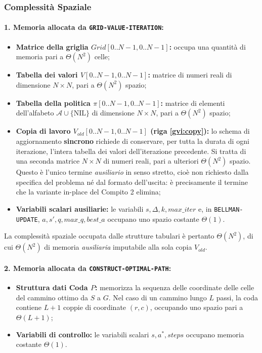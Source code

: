 \clearpage
\subsubsection{Complessità Spaziale}

\paragraph{1. Memoria allocata da \texttt{GRID-VALUE-ITERATION}:}
\begin{itemize}
    \item \textbf{Matrice della griglia $Grid[0..N-1, 0..N-1]$:} occupa una quantità di memoria pari a $\Theta(N^2)$ celle;
    \item \textbf{Tabella dei valori $V[0..N-1, 0..N-1]$:} matrice di numeri reali di dimensione $N \times N$, pari a $\Theta(N^2)$ spazio;
    \item \textbf{Tabella della politica $\pi[0..N-1, 0..N-1]$:} matrice di elementi dell'alfabeto $\mathcal{A} \cup \{\text{NIL}\}$ di dimensione $N \times N$, pari a $\Theta(N^2)$ spazio;
    \item \textbf{Copia di lavoro $V_{old}[0..N-1, 0..N-1]$ (riga \ref{gvi:copy}):} lo schema di aggiornamento \textbf{sincrono} richiede di conservare, per tutta la durata di ogni iterazione, l'intera tabella dei valori dell'iterazione precedente. Si tratta di una seconda matrice $N \times N$ di numeri reali, pari a ulteriori $\Theta(N^2)$ spazio. Questo è l'unico termine \textit{ausiliario} in senso stretto, cioè non richiesto dalla specifica del problema né dal formato dell'uscita: è precisamente il termine che la variante in-place del Compito 2 elimina;
    \item \textbf{Variabili scalari ausiliarie:} le variabili $s, \Delta, k, max\_iter$ e, in \texttt{BELLMAN-UPDATE}, $a, s', q, max\_q, best\_a$ occupano uno spazio costante $\Theta(1)$.
\end{itemize}

La complessità spaziale occupata dalle strutture tabulari è pertanto $\Theta(N^2)$, di cui $\Theta(N^2)$ di memoria \textit{ausiliaria} imputabile alla sola copia $V_{old}$.

\paragraph{2. Memoria allocata da \texttt{CONSTRUCT-OPTIMAL-PATH}:}
\begin{itemize}
    \item \textbf{Struttura dati Coda $P$:} memorizza la sequenza delle coordinate delle celle del cammino ottimo da $S$ a $G$. Nel caso di un cammino lungo $L$ passi, la coda contiene $L + 1$ coppie di coordinate $(r, c)$, occupando uno spazio pari a $\Theta(L + 1)$;
    \item \textbf{Variabili di controllo:} le variabili scalari $s, a^*, steps$ occupano memoria costante $\Theta(1)$.
\end{itemize}


